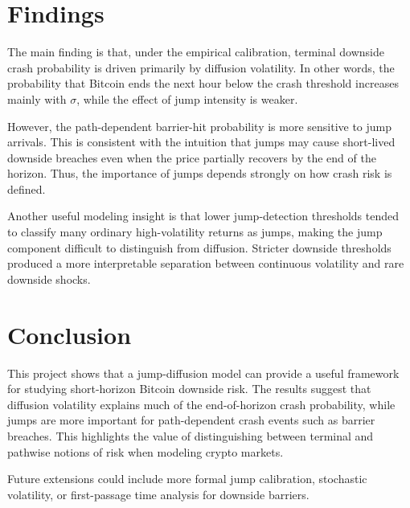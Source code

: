 \documentclass[11pt]{article}
\begin{document}
\section*{Findings}

The main finding is that, under the empirical calibration, terminal downside crash probability is driven primarily by diffusion volatility. In other words, the probability that Bitcoin ends the next hour below the crash threshold increases mainly with \(\sigma\), while the effect of jump intensity is weaker.

However, the path-dependent barrier-hit probability is more sensitive to jump arrivals. This is consistent with the intuition that jumps may cause short-lived downside breaches even when the price partially recovers by the end of the horizon. Thus, the importance of jumps depends strongly on how crash risk is defined.

Another useful modeling insight is that lower jump-detection thresholds tended to classify many ordinary high-volatility returns as jumps, making the jump component difficult to distinguish from diffusion. Stricter downside thresholds produced a more interpretable separation between continuous volatility and rare downside shocks.

\section*{Conclusion}

This project shows that a jump-diffusion model can provide a useful framework for studying short-horizon Bitcoin downside risk. The results suggest that diffusion volatility explains much of the end-of-horizon crash probability, while jumps are more important for path-dependent crash events such as barrier breaches. This highlights the value of distinguishing between terminal and pathwise notions of risk when modeling crypto markets.

Future extensions could include more formal jump calibration, stochastic volatility, or first-passage time analysis for downside barriers.
\end{document}
